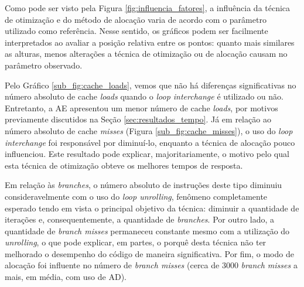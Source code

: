 \documentclass[12pt,a4paper]{article}
\begin{document}
Como pode ser visto pela Figura \ref{fig:influencia_fatores}, a influência da técnica de otimização e do método de alocação varia de acordo com o parâmetro utilizado como referência. Nesse sentido, os gráficos podem ser facilmente interpretados ao avaliar a posição relativa entre os pontos: quanto mais similares as alturas, menos alterações a técnica de otimização ou de alocação causam no parâmetro observado.  


Pelo Gráfico \ref{sub_fig:cache_loads}, vemos que não há diferenças significativas no número absoluto de cache \textit{loads} quando o \textit{loop interchange} é utilizado ou não. Entretanto, a AE apresentou um menor número de cache \textit{loads}, por motivos previamente discutidos na Seção \ref{sec:resultados_tempo}. Já em relação ao número absoluto de cache \textit{misses} (Figura \ref{sub_fig:cache_misses}), o uso do \textit{loop interchange} foi responsável por diminuí-lo, enquanto a técnica de alocação pouco influenciou. Este resultado pode explicar, majoritariamente, o motivo pelo qual esta técnica de otimização obteve os melhores tempos de resposta.


Em relação às \textit{branches}, o número absoluto de instruções deste tipo diminuiu consideravelmente com o uso do \textit{loop unrolling}, fenômeno completamente esperado tendo em vista o principal objetivo da técnica: diminuir a quantidade de iterações e, consequentemente, a quantidade de \textit{branches}. Por outro lado, a quantidade de \textit{branch misses} permaneceu constante mesmo com a utilização do \textit{unrolling}, o que pode explicar, em partes, o porquê desta técnica não ter melhorado o desempenho do código de maneira significativa. Por fim, o modo de alocação foi influente no número de \textit{branch misses} (cerca de $3000$ \textit{branch misses} a mais, em média, com uso de AD). 
\end{document}
